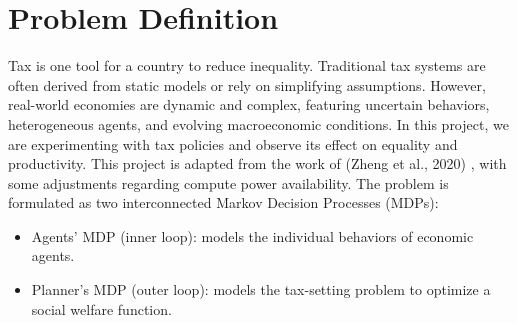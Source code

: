 \section{Problem Definition}

Tax is one tool for a country to reduce inequality. Traditional tax systems are often derived from static models or rely on simplifying assumptions. However, real-world economies are dynamic and complex, featuring uncertain behaviors, heterogeneous agents, and evolving macroeconomic conditions. In this project, we are experimenting with tax policies and observe its effect on equality and productivity. This project is adapted from the work of (Zheng et al., 2020) , with some adjustments regarding compute power availability. The problem is formulated as two interconnected Markov Decision Processes (MDPs):
\begin{itemize}
    \item Agents' MDP (inner loop): models the individual behaviors of economic agents.
    \item Planner's MDP (outer loop): models the tax-setting problem to optimize a social welfare function.
\end{itemize}

